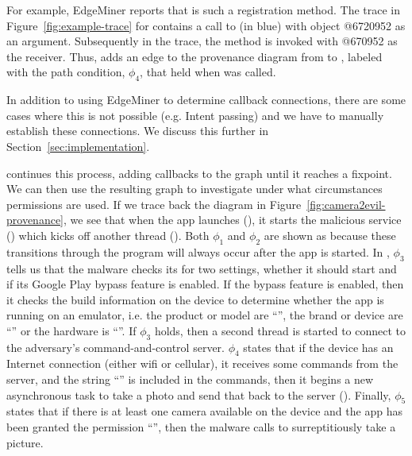 For example, EdgeMiner reports that  is such a
registration method. The trace in Figure~\ref{fig:example-trace} for
 contains a call to  (in blue) with
object @6720952 as an argument. Subsequently in the trace, the
 method is invoked with @670952 as the
receiver. Thus, \hogarth{} adds an edge to the provenance diagram
from  to , labeled with
the path condition, $\phi_4$, that held when  was
called.

In addition to using EdgeMiner to determine callback connections, 
there are some cases where this is not possible (e.g. Intent passing) and 
we have to manually establish these connections.  We discuss this further 
in Section~\ref{sec:implementation}.

\hogarth{} continues this process, adding callbacks to the graph
until it reaches a fixpoint. We can then use the resulting graph to
investigate under what circumstances permissions are used. If we trace
back the diagram in Figure~\ref{fig:camera2evil-provenance}, we see
that when the app launches (), it starts the malicious 
service () which kicks off another thread 
().  Both $\phi_1$ and $\phi_2$ are shown as 
 because these transitions through the program will always 
occur after the app is started.  In , $\phi_3$ tells 
us that the malware checks its  for 
two settings, whether it should start and if its Google Play bypass 
feature is enabled.  If the bypass feature is enabled, then it checks 
the build information on the device to determine whether the 
app is running on an emulator, i.e. the product or model are ``'',
the brand or device are ``'' or the hardware is ``''.  If
$\phi_3$ holds, then a second thread  is started 
to connect to the adversary's command-and-control server.  $\phi_4$ 
states that if the device has an Internet connection (either wifi or cellular), 
it receives some commands from the server, and the string ``'' is included in the commands, then it begins a new 
asynchronous task to take a photo and send that back to the server 
().  Finally, $\phi_5$ states that if 
there is at least one camera available on the device and the app 
has been granted the permission ``'', 
then the malware calls  to 
surreptitiously take a picture.

